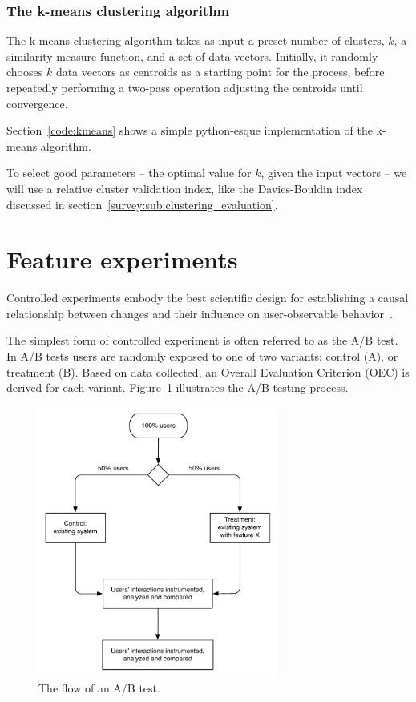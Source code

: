 \subsubsection{The k-means clustering algorithm}
\label{subs:kmeans}

The k-means clustering algorithm takes as input a preset number of clusters, $k$, a similarity measure function, and a set of data vectors. Initially, it randomly chooses $k$ data vectors as centroids as a starting point for the process, before repeatedly performing a two-pass operation adjusting the centroids until convergence.

Section~\ref{code:kmeans} shows a simple python-esque implementation of the k-means algorithm.

To select good parameters -- the optimal value for $k$, given the input vectors -- we will use a relative cluster validation index, like the Davies-Bouldin index discussed in section~\ref{survey:sub:clustering_evaluation}.

\section{Feature experiments}
\label{approach:sec:feature_experiments}

Controlled experiments embody the best scientific design for establishing a causal relationship between changes and their influence on user-observable behavior~\cite{Kohavi2007,Kohavi2008}.

The simplest form of controlled experiment is often referred to as the A/B test. In A/B tests users are randomly exposed to one of two variants: control (A), or treatment (B). Based on data collected, an Overall Evaluation Criterion (OEC) is derived for each variant. Figure~\ref{fig:ab_flow} illustrates the A/B testing process.

\begin{figure}[h]
  \centering
    \includegraphics[width=0.7\textwidth]{Figures/ab-test-flow}
    \caption{The flow of an A/B test.}
    \label{fig:ab_flow}
\end{figure}

